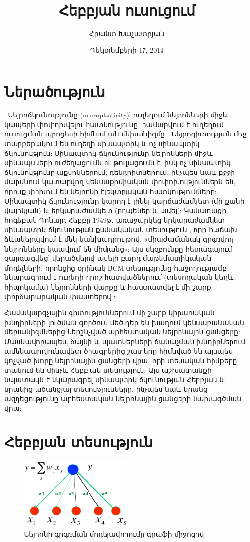 \documentclass[12pt,final]{amsproc}
\title{Հեբբյան ուսուցում}
\author{Հրանտ Խաչատրյան}
\date{Դեկտեմբերի 17, 2014}
\makeatletter
\newcommand{\addresseshere}{%
  \enddoc@text\let\enddoc@text\relax
}
\makeatother
\begin{document}
\maketitle
\addresseshere

\section{Ներածություն}\
Նեյրոճկունությունը (neuroplasticity)՝ ուղեղում նեյրոնների միջև կապերի փոփոխվելու հատկությունը, համարվում է ուղեղում ուսուցման պրոցեսի հիմնական մեխանիզմը \cite{doi:10.1146/annurev.neuro.27.070203.144216}: Նեյրոգիտության մեջ տարբերակում են ուղեղի սինապտիկ և ոչ սինապտիկ ճկունություն: Սինապտիկ ճկունությունը նեյրոնների միջև սինապսների ուժեղացումն ու թուլացումն է, իսկ ոչ սինապտիկ ճկունությունը աքսոններում, դենդրիտներում, ինչպես նաև բջջի մարմնում կատարվող կենսաքիմիական փոփոխություններն են, որոնք փոխում են նեյրոնի էլեկտրական հատկությունները: Սինապտիկ ճկունությունը կարող է լինել կարճաժամկետ (մի քանի վայրկյան) և երկարաժամկետ (րոպեներ և ավել): Կանադացի հոգեբան Դոնալդ Հեբբը 1949թ․ առաջարկեց երկարաժամկետ սինապտիկ ճկունության քանակական տեսություն \cite{Hebb194912}, որը հաճախ ձևակերպվում է մեկ կանխադրույթով․ «միաժամանակ գրգռվող նեյրոնները կապվում են միմյանց»: Այս սկզբունքը հետագայում զարգացվեց՝ վերածվելով ավելի բարդ մաթեմատիկական մոդելների, որոնցից օրինակ BCM տեսությունը հաջողությամբ նկարագրում է ուղեղի որոշ հատվածներում (տեսողական կեղև, հիպոկամպ) նեյրոնների վարքը և հաստատվել է մի շարք փորձարարական փաստերով \cite{CooperIntratorBlaisShouval200404}: 

Համակարգչային գիտություններում մի շարք կիրառական խնդիրների լուծման գործում մեծ դեր են խաղում կենսաբանական մեխանիզմներից ներշնչված արհեստական նեյրոնային ցանցերը: Մասնավորապես, ձայնի և պատկերների ճանաչման խնդիրներում ամենաարդյունավետ ծրագրերից շատերը հիմնված են այսպես կոչված խորը նեյրոնային ցանցերի վրա, որի տեսական հիմքերը տանում են մինչև Հեբբյան տեսություն: Այս աշխատանքի նպատակն է նկարագրել սինապտիկ ճկունության Հեբբյան և նրանից ածանցյալ տեսությունները, ինչպես նաև նրանց ազդեցությունը արհեստական նեյրոնային ցանցերի նախագծման վրա: 

\section{Հեբբյան տեսություն}

\begin{figure}[b!]
\centering
\includegraphics[width=0.5\textwidth]{neuron.png}
\caption{Նեյրոնի գրգռման մոդելավորումը գրաֆի միջոցով \cite{BCMSlides}}
\label{neuron}
\end{figure}
\end{document}
